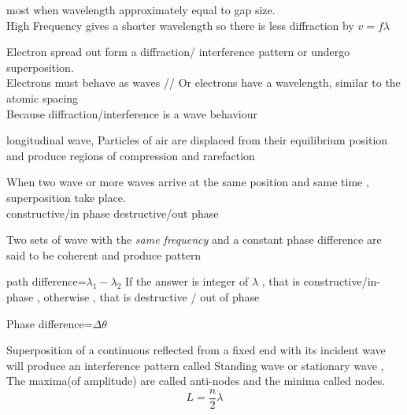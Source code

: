 \documentclass[a4paper]{article}
\begin{document}
\begin{defi}[Diffraction]
most when wavelength approximately equal to gap size.\\

High Frequency gives a shorter wavelength so there is less diffraction by $v=f\lambda$\\


\end{defi}
\begin{defi}
Electron spread out form a diffraction/ interference pattern or undergo superposition.\\
Electrons must behave as waves
//
Or electrons have a wavelength, similar to the atomic spacing\\
Because diffraction/interference is a wave behaviour
\end{defi}

\begin{defi}
longitudinal wave, Particles of air are displaced from their equilibrium position and produce regions of compression and rarefaction
\end{defi}

\begin{defi}[Superposition]
When two wave or more waves arrive at the same position and same time , superposition take place.\\

constructive/in phase
destructive/out phase
\end{defi}

\begin{defi}[Interference]
Two sets of wave with the \emph{same frequency} and a constant phase difference are said to be coherent and produce pattern
\end{defi}

\begin{defi}
path difference=$\lambda_1-\lambda_2$
If the answer is integer of $\lambda$ , that is constructive/in-phase , otherwise , that is destructive / out of phase

Phase difference=$\Delta\theta$
\end{defi}

\begin{defi}
Superposition of a continuous reflected from a fixed end with its incident wave will produce an interference pattern called Standing wave or stationary wave , The maxima(of amplitude) are called anti-nodes and the minima called nodes.
\begin{equation*}
    L=\frac{n}{2}\dot \lambda
\end{equation*}
\end{defi}
\end{document}
